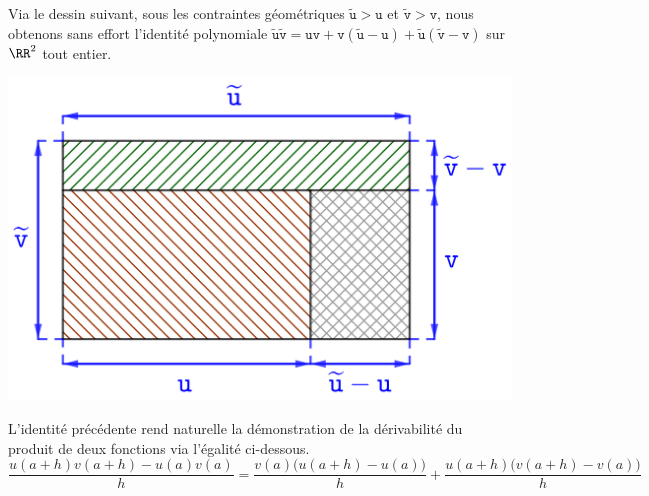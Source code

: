 \begin{example}
    Via le dessin suivant, sous les contraintes géométriques
    $\widetilde{\mathtt{u}} > \mathtt{u}$
    et
    $\widetilde{\mathtt{v}} > \mathtt{v}$,
    nous obtenons sans effort l'identité polynomiale
    $ \widetilde{\mathtt{u}} \widetilde{\mathtt{v}}
    = \mathtt{u} \mathtt{v}
    + \mathtt{v} ( \widetilde{\mathtt{u}} - \mathtt{u} )
    + \widetilde{\mathtt{u}} ( \widetilde{\mathtt{v}} - \mathtt{v} )$
    sur $\RR^2$ tout entier.

	\begin{center}
		\includegraphics[scale=.75]{proder.png}
	\end{center}
    
    L'identité précédente rend naturelle la démonstration de la dérivabilité du produit de deux fonctions via l'égalité ci-dessous.
    \[
          \frac{u(a+h) v(a+h) - u(a) v(a)}{h}
        = \frac{v(a) \big( u(a+h) - u(a) \big)}{h} 
        + \frac{u(a+h) \big( v(a+h) - v(a) \big)}{h}
    \]
\end{example}
